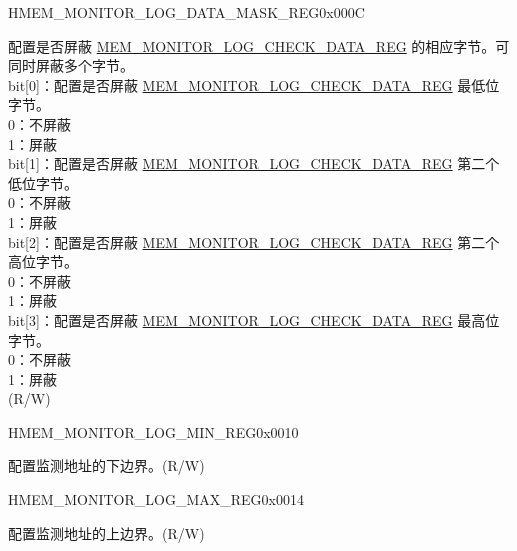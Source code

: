 \begin{register}{H}{MEM\_MONITOR\_LOG\_DATA\_MASK\_REG}{0x000C}\label{regdesc:MEMMONITORLOGDATAMASKREG}
%
%
\regnewline%
\begin{regdesc}\begin{reglist}
\label{fielddesc:MEMMONITORLOGDATAMASK}\item[MEM\_MONITOR\_LOG\_DATA\_MASK] 配置是否屏蔽 \hyperref[regdesc:MEMMONITORLOGCHECKDATAREG]{MEM\_MONITOR\_LOG\_CHECK\_DATA\_REG} 的相应字节。可同时屏蔽多个字节。\\
bit[0]：配置是否屏蔽 \hyperref[regdesc:MEMMONITORLOGCHECKDATAREG]{MEM\_MONITOR\_LOG\_CHECK\_DATA\_REG} 最低位字节。\\
0：不屏蔽\\
1：屏蔽\\
bit[1]：配置是否屏蔽 \hyperref[regdesc:MEMMONITORLOGCHECKDATAREG]{MEM\_MONITOR\_LOG\_CHECK\_DATA\_REG} 第二个低位字节。\\
0：不屏蔽\\
1：屏蔽\\
bit[2]：配置是否屏蔽 \hyperref[regdesc:MEMMONITORLOGCHECKDATAREG]{MEM\_MONITOR\_LOG\_CHECK\_DATA\_REG} 第二个高位字节。\\
0：不屏蔽\\
1：屏蔽\\
bit[3]：配置是否屏蔽 \hyperref[regdesc:MEMMONITORLOGCHECKDATAREG]{MEM\_MONITOR\_LOG\_CHECK\_DATA\_REG} 最高位字节。\\
0：不屏蔽\\
1：屏蔽\\
(R/W)
\end{reglist}\end{regdesc}
\end{register}


\begin{register}{H}{MEM\_MONITOR\_LOG\_MIN\_REG}{0x0010}\label{regdesc:MEMMONITORLOGMINREG}
%
\regnewline%
\begin{regdesc}\begin{reglist}
\label{fielddesc:MEMMONITORLOGMIN}\item [MEM\_MONITOR\_LOG\_MIN] 配置监测地址的下边界。(R/W)
\end{reglist}\end{regdesc}
\end{register}


\begin{register}{H}{MEM\_MONITOR\_LOG\_MAX\_REG}{0x0014}\label{regdesc:MEMMONITORLOGMAXREG}
%
\regnewline%
\begin{regdesc}\begin{reglist}
\label{fielddesc:MEMMONITORLOGMAX}\item [MEM\_MONITOR\_LOG\_MAX] 配置监测地址的上边界。(R/W)
\end{reglist}\end{regdesc}
\end{register}


